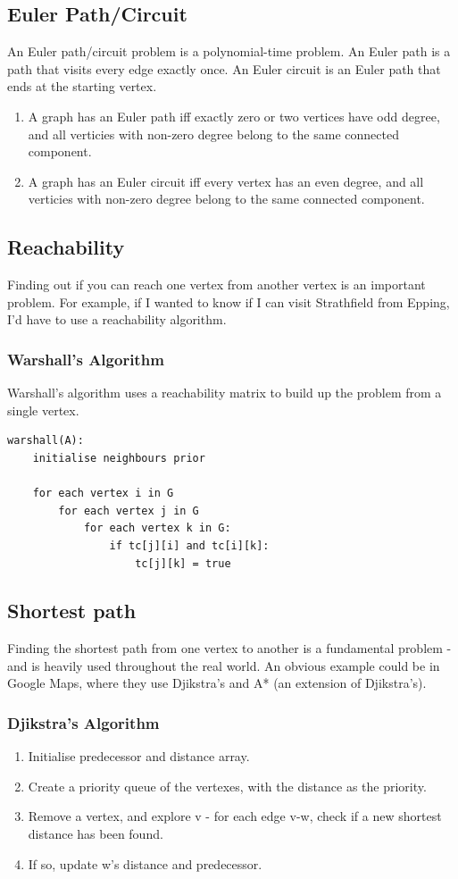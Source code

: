 \documentclass[14]{article}
\begin{document}
\subsection{Euler Path/Circuit}
An Euler path/circuit problem is a polynomial-time problem. An Euler path is a path that visits every edge exactly once.
An Euler circuit is an Euler path that ends at the starting vertex.
\begin{enumerate}
    \item A graph has an Euler path iff exactly zero or two vertices have odd degree, and all verticies with non-zero degree
        belong to the same connected component.
    \item A graph has an Euler circuit iff every vertex has an even degree, and all verticies with non-zero degree belong 
        to the same connected component. 
\end{enumerate}
\subsection{Reachability}
Finding out if you can reach one vertex from another vertex is an important problem. For example, if I wanted to know if I can
visit Strathfield from Epping, I'd have to use a reachability algorithm. 
\subsubsection{Warshall's Algorithm}
Warshall's algorithm uses a reachability matrix to build up the problem from a single vertex. 
\begin{verbatim}
warshall(A):
    initialise neighbours prior

    for each vertex i in G
        for each vertex j in G
            for each vertex k in G:
                if tc[j][i] and tc[i][k]:
                    tc[j][k] = true
\end{verbatim}
\subsection{Shortest path}
Finding the shortest path from one vertex to another is a fundamental problem - and is heavily used throughout the real world.
An obvious example could be in Google Maps, where they use Djikstra's and A* (an extension of Djikstra's).
\subsubsection{Djikstra's Algorithm}
\begin{enumerate}
    \item Initialise predecessor and distance array. 
    \item Create a priority queue of the vertexes, with the distance as the priority.
    \item Remove a vertex, and explore v - for each edge v-w, check if a new shortest distance has been found.
    \item If so, update w's distance and predecessor.
\end{enumerate}
\end{document}

